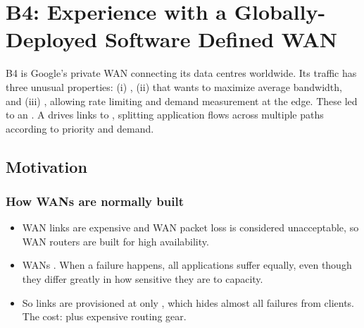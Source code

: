 \chapter{B4: Experience with a Globally-Deployed Software Defined WAN}

\begin{keybox}
B4 is Google's private WAN connecting its data centres worldwide. Its traffic has three unusual properties: (i) , (ii)  that wants to maximize average bandwidth, and (iii) , allowing rate limiting and demand measurement at the edge. These led to an . A  drives links to , splitting application flows across multiple paths according to priority and demand.
\end{keybox}

\section{Motivation}
\subsection{How WANs are normally built}
\begin{itemize}
\item WAN links are expensive and WAN packet loss is considered unacceptable, so WAN routers are  built for high availability.
\item WANs . When a failure happens, all applications suffer equally, even though they differ greatly in how sensitive they are to capacity.
\item So links are provisioned at only , which hides almost all failures from clients. The cost:  plus expensive routing gear.
\end{itemize}

